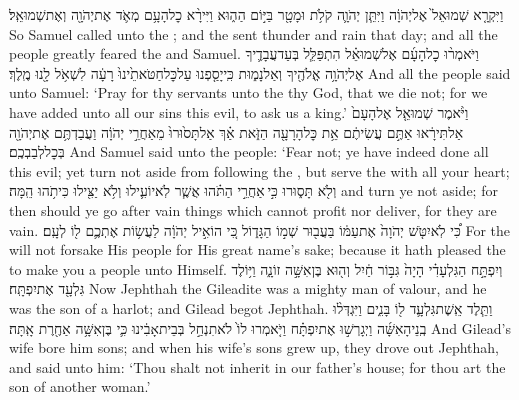 {וַיִּקְרָ֤א שְׁמוּאֵל֙ אֶל\maqqaf יְהֹוָ֔ה וַיִּתֵּ֧ן יְהֹוָ֛ה קֹלֹ֥ת וּמָטָ֖ר בַּיּ֣וֹם הַה֑וּא וַיִּירָ֨א כׇל\maqqaf הָעָ֥ם מְאֹ֛ד אֶת\maqqaf יְהֹוָ֖ה וְאֶת\maqqaf שְׁמוּאֵֽל׃}
{So Samuel called unto the \lord; and the \lord\space sent thunder and rain that day; and all the people greatly feared the \lord\space and Samuel.}
{וַיֹּאמְר֨וּ כׇל\maqqaf הָעָ֜ם אֶל\maqqaf שְׁמוּאֵ֗ל הִתְפַּלֵּ֧ל בְּעַד\maqqaf עֲבָדֶ֛יךָ אֶל\maqqaf יְהֹוָ֥ה אֱלֹהֶ֖יךָ וְאַל\maqqaf נָמ֑וּת כִּֽי\maqqaf יָסַ֤פְנוּ עַל\maqqaf כׇּל\maqqaf חַטֹּאתֵ֙ינוּ֙ רָעָ֔ה לִשְׁאֹ֥ל לָ֖נוּ מֶֽלֶךְ׃}
{And all the people said unto Samuel: ‘Pray for thy servants unto the \lord\space thy God, that we die not; for we have added unto all our sins this evil, to ask us a king.’}
{וַיֹּ֨אמֶר שְׁמוּאֵ֤ל אֶל\maqqaf הָעָם֙ אַל\maqqaf תִּירָ֔אוּ אַתֶּ֣ם עֲשִׂיתֶ֔ם אֵ֥ת כׇּל\maqqaf הָרָעָ֖ה הַזֹּ֑את אַ֗ךְ אַל\maqqaf תָּס֙וּרוּ֙ מֵאַחֲרֵ֣י יְהֹוָ֔ה וַעֲבַדְתֶּ֥ם אֶת\maqqaf יְהֹוָ֖ה בְּכׇל\maqqaf לְבַבְכֶֽם׃}
{And Samuel said unto the people: ‘Fear not; ye have indeed done all this evil; yet turn not aside from following the \lord, but serve the \lord\space with all your heart;}
{וְלֹ֖א תָּס֑וּרוּ כִּ֣י \legarmeh  אַחֲרֵ֣י הַתֹּ֗הוּ אֲשֶׁ֧ר לֹֽא\maqqaf יוֹעִ֛ילוּ וְלֹ֥א יַצִּ֖ילוּ כִּי\maqqaf תֹ֥הוּ הֵֽמָּה׃}
{and turn ye not aside; for then should ye go after vain things which cannot profit nor deliver, for they are vain.}
{כִּ֠י לֹֽא\maqqaf יִטֹּ֤שׁ יְהֹוָה֙ אֶת\maqqaf עַמּ֔וֹ בַּעֲב֖וּר שְׁמ֣וֹ הַגָּד֑וֹל כִּ֚י הוֹאִ֣יל יְהֹוָ֔ה לַעֲשׂ֥וֹת אֶתְכֶ֛ם ל֖וֹ לְעָֽם׃}
{For the \lord\space will not forsake His people for His great name’s sake; because it hath pleased the \lord\space to make you a people unto Himself.}
\newperek
{}
\label{haft_39}
\setcounter{chap}{11}
\setcounter{verse}{1}
{וְיִפְתָּ֣ח הַגִּלְעָדִ֗י הָיָה֙ גִּבּ֣וֹר חַ֔יִל וְה֖וּא בֶּן\maqqaf אִשָּׁ֣ה זוֹנָ֑ה וַיּ֥וֹלֶד גִּלְעָ֖ד אֶת\maqqaf יִפְתָּֽח׃}
{Now Jephthah the Gileadite was a mighty man of valour, and he was the son of a harlot; and Gilead begot Jephthah.}
{וַתֵּ֧לֶד אֵֽשֶׁת\maqqaf גִּלְעָ֛ד ל֖וֹ בָּנִ֑ים וַיִּגְדְּל֨וּ בְֽנֵי\maqqaf הָאִשָּׁ֜ה וַיְגָרְשׁ֣וּ אֶת\maqqaf יִפְתָּ֗ח וַיֹּ֤אמְרוּ לוֹ֙ לֹא\maqqaf תִנְחַ֣ל בְּבֵית\maqqaf אָבִ֔ינוּ כִּ֛י בֶּן\maqqaf אִשָּׁ֥ה אַחֶ֖רֶת אָֽתָּה׃}
{And Gilead’s wife bore him sons; and when his wife’s sons grew up, they drove out Jephthah, and said unto him: ‘Thou shalt not inherit in our father’s house; for thou art the son of another woman.’}
